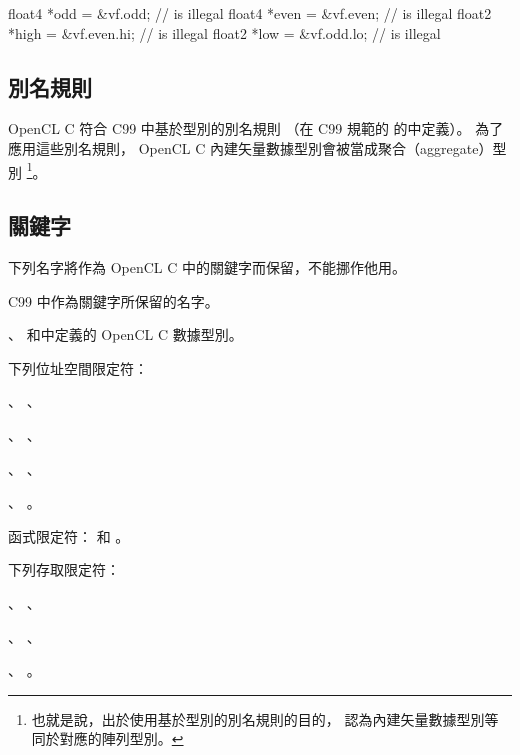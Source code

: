float4	*odd = &vf.odd;		// is illegal
float4	*even = &vf.even;	// is illegal
float2	*high = &vf.even.hi;	// is illegal
float2	*low = &vf.odd.lo;	// is illegal
\stopclc

\subsection{別名規則}

OpenCL C  符合 C99 中基於型別的別名規則
（在 C99 規範的{} 的{}中定義）。
為了應用這些別名規則， OpenCL C 內建矢量數據型別會被當成聚合（aggregate）型別
\footnote{也就是說，出於使用基於型別的別名規則的目的，
認為內建矢量數據型別等同於對應的陣列型別。}。

\subsection{關鍵字}

下列名字將作為 OpenCL C 中的關鍵字而保留，不能挪作他用。
\startigBase
\item C99 中作為關鍵字所保留的名字。

\item {}、
和中定義的 OpenCL C 數據型別。

\startitem
下列位址空間限定符：
\startigBase
\item {}、 、
\item {}、 、
\item {}、 、
\item {}、 。
\stopigBase
\stopitem

\item 函式限定符：  和 。

\startitem
下列存取限定符：
\startigBase
\item {}、 、
\item {}、 、
\item {}、 。
\stopigBase
\stopitem
\stopigBase

